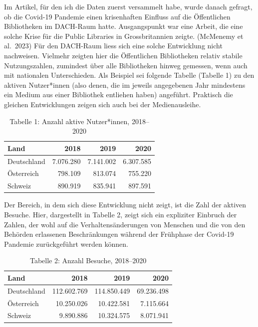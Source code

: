 \documentclass[a4paper,
fontsize=11pt,
oneside,
numbers=noperiodatend,
parskip=half-,
bibliography=totoc,
final
]{scrartcl}
\begin{document}
Im Artikel, für den ich die Daten zuerst versammelt habe, wurde danach
gefragt, ob die Covid-19 Pandemie einen krisenhaften Einfluss auf die
Öffentlichen Bibliotheken im DACH-Raum hatte. Ausgangspunkt war eine
Arbeit, die eine solche Krise für die Public Libraries in
Grossbritannien zeigte. (McMenemy et al.~2023) Für den DACH-Raum liess
sich eine solche Entwicklung nicht nachweisen. Vielmehr zeigten hier die
Öffentlichen Bibliotheken relativ stabile Nutzungszahlen, zumindest über
alle Bibliotheken hinweg gemessen, wenn auch mit nationalen
Unterschieden. Als Beispiel sei folgende Tabelle (Tabelle 1) zu den
aktiven Nutzer*innen (also denen, die im jeweils angegebenen Jahr
mindestens ein Medium aus einer Bibliothek entliehen haben) angeführt.
Praktisch die gleichen Entwicklungen zeigen sich auch bei der
Medienausleihe.

\begin{table}
\begin{center}
\begin{tabular}{lrrr}
Land & 2018 & 2019 & 2020 \\ 
 \hline
Deutschland & 7.076.280 & 7.141.002 & 6.307.585 \\
Österreich & 798.109 & 813.074 & 755.220 \\
Schweiz & 890.919 & 835.941 & 897.591 \\
\end{tabular}
\caption{Tabelle 1: Anzahl aktive Nutzer*innen, 2018--2020}
\end{center}
\end{table}

Der Bereich, in dem sich diese Entwicklung nicht zeigt, ist die Zahl der
aktiven Besuche. Hier, dargestellt in Tabelle 2, zeigt sich ein
expliziter Einbruch der Zahlen, der wohl auf die Verhaltensänderungen
von Menschen und die von den Behörden erlassenen Beschränkungen während
der Frühphase der Covid-19 Pandemie zurückgeführt werden können.

\begin{table}
\begin{center}
\begin{tabular}{lrrr}
Land & 2018 & 2019 & 2020 \\
\hline
Deutschland & 112.602.769 & 114.850.449 & 69.236.498 \\
Österreich & 10.250.026 & 10.422.581 & 7.115.664 \\
Schweiz & 9.890.886 & 10.324.575 & 8.071.941 \\
\end{tabular}
\caption{Tabelle 2: Anzahl Besuche, 2018--2020}
\end{center}
\end{table}
\end{document}
